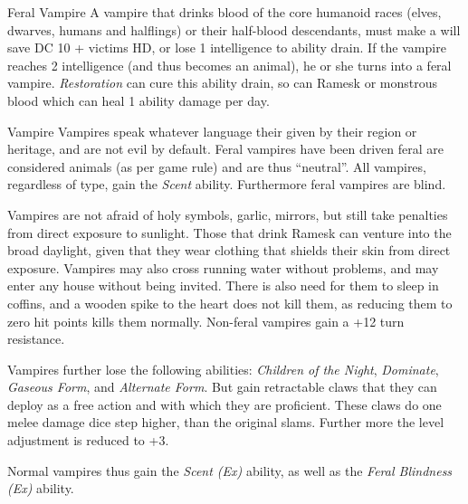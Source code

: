 \begin{35e}{Feral Vampire}
  A vampire that drinks blood of the core humanoid races (elves, dwarves,
  humans and halflings) or their half-blood descendants, must make a will save
  DC 10 + victims HD, or lose 1 intelligence to ability drain. If the vampire
  reaches 2 intelligence (and thus becomes an animal), he or she turns into a
  feral vampire. \emph{Restoration} can cure this ability drain, so can Ramesk
  or monstrous blood which can heal 1 ability damage per day.
\end{35e}

\begin{35e}{Vampire}
  Vampires speak whatever language their given by their region or heritage,
  and are not evil by default. Feral vampires have been driven feral are
  considered animals (as per game rule) and are thus ``neutral''. All
  vampires, regardless of type, gain the \emph{Scent} ability. Furthermore
  feral vampires are blind.

  Vampires are not afraid of holy symbols, garlic, mirrors, but still take
  penalties from direct exposure to sunlight. Those that drink Ramesk can
  venture into the broad daylight, given that they wear clothing that shields
  their skin from direct exposure. Vampires may also cross running water
  without problems, and may enter any house without being invited. There is
  also need for them to sleep in coffins, and a wooden spike to the heart does
  not kill them, as reducing them to zero hit points kills them normally.
  Non-feral vampires gain a +12 turn resistance.

  Vampires further lose the following abilities: \emph{Children of the Night},
  \emph{Dominate}, \emph{Gaseous Form}, and \emph{Alternate Form}. But gain
  retractable claws that they can deploy as a free action and with which they
  are proficient. These claws do one melee damage dice step higher, than the
  original slams. Further more the level adjustment is reduced to +3.

  Normal vampires thus gain the \emph{Scent (Ex)} ability, as well as the
  \emph{Feral Blindness (Ex)} ability.


\end{35e}
